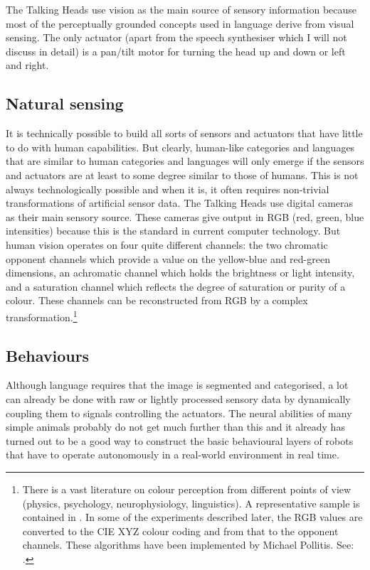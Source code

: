 The Talking Heads use vision as the main source of
sensory information because most of the perceptually 
grounded concepts used in language derive from visual
sensing. The only actuator (apart from the speech 
synthesiser which I will not discuss in detail) 
is a pan/tilt motor for turning the head up and down 
or left and right. 

\subsection{Natural sensing}

It is technically possible to build all sorts of 
sensors and actuators that have little to do with
human capabilities. But clearly, human-like categories and languages 
that are similar to human categories and languages will only 
emerge if the sensors and actuators are at least to some degree similar to those
of humans. This is not always technologically 
possible and when it is, it often 
requires non-trivial transformations of artificial 
sensor data. The Talking Heads use digital cameras 
as their main sensory source. These cameras give output 
in RGB (red, green, blue intensities) because this 
is the standard in current computer 
technology. But human vision operates
on four quite different channels: the two chromatic 
opponent channels which provide a value on the 
yellow-blue and red-green dimensions, an achromatic 
channel which holds the brightness or light 
intensity, and a saturation channel which reflects the 
degree of saturation or purity of a colour. These 
channels can be reconstructed from RGB by a complex 
transformation.\footnote{
There is a vast literature on colour perception from 
different points of view (physics, psychology, 
neurophysiology, linguistics). A representative sample 
is contained in \cite{Byrne:1997}. 
In some of the experiments described later, the RGB values
are converted to the CIE XYZ colour coding and from 
that to the opponent channels. 
These algorithms have been implemented by Michael
Pollitis. See: \cite{Kaiser:1996}. 
}

\subsection{Behaviours}

Although language requires that the image is 
segmented and categorised, a lot can already
be done with raw or lightly processed sensory data
by dynamically coupling them to signals 
controlling the actuators. The neural abilities
of many simple animals probably do not get much further
than this and it already has turned
out to be a good way to construct the basic behavioural
layers of robots that have to operate autonomously 
in a real-world environment in real time. 


